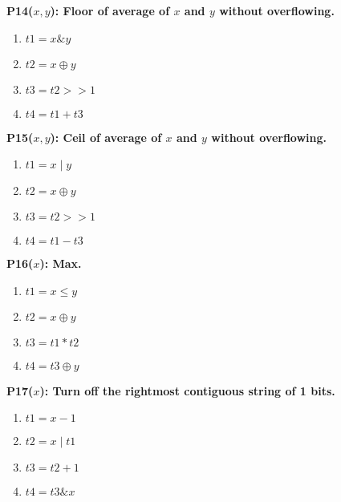 \documentclass[a4paper]{llncs}
\begin{document}
\begin{figure}
\begin{multicols}{4}
   \begin{minipage}{.2\textwidth}
   \bf{P14}($x, y$): Floor of average of $x$ and $y$ without overflowing.
   \begin{enumerate}
    \item $t1 = x \& y$
    \item $t2 = x \oplus y$
    \item $t3 = t2 >> 1$
    \item $t4 = t1 + t3$
   \end{enumerate}
   \end{minipage}
   \vspace{12pt}
   
   \begin{minipage}{.2\textwidth}
   \bf{P15}($x, y$): Ceil of average of $x$ and $y$ without overflowing.
   \begin{enumerate}
    \item $t1 = x \mid y$
    \item $t2 = x \oplus y$
    \item $t3 = t2 >> 1$
    \item $t4 = t1 - t3$
   \end{enumerate}
   \end{minipage}
   \vspace{12pt}
   
   \begin{minipage}{.2\textwidth}
   \bf{P16}($x$): Max.
   \begin{enumerate}
    \item $t1 = x \leq y$
    \item $t2 = x \oplus y$
    \item $t3 = t1 * t2$
    \item $t4 = t3 \oplus y$
   \end{enumerate}
   \end{minipage}
   \vspace{12pt}
   
   \begin{minipage}{.2\textwidth}
   \bf{P17}($x$): Turn off the rightmost contiguous string of 1 bits.
   \begin{enumerate}
    \item $t1 = x - 1$
    \item $t2 = x \mid t1$
    \item $t3 = t2 + 1$
    \item $t4 = t3 \& x$
   \end{enumerate}
   \end{minipage}
   \vspace{12pt}
   

\end{multicols}
\end{figure}
\end{document}
